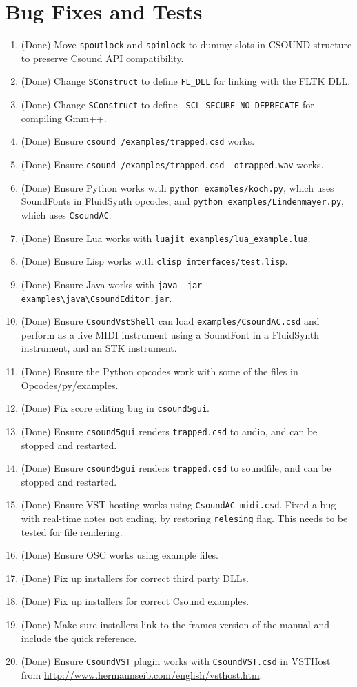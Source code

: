 \documentclass[11pt,letterpaper,onecolumn]{scrartcl}
\begin{document}
\begin{sloppypar}
\section{Bug Fixes and Tests}
\label{sec:BugFixesAndTests}

\begin{enumerate}
	\item (Done) Move \texttt{spoutlock} and \texttt{spinlock} to dummy slots in CSOUND structure to preserve Csound API compatibility.
	\item (Done) Change \texttt{SConstruct} to define \verb|FL_DLL| for linking with the FLTK DLL.
	\item (Done) Change \texttt{SConstruct} to define \verb|_SCL_SECURE_NO_DEPRECATE| for compiling Gmm++.
	\item (Done) Ensure \texttt{csound /examples/trapped.csd} works.
	\item (Done) Ensure \texttt{csound /examples/trapped.csd -otrapped.wav} works.
	\item (Done) Ensure Python works with \texttt{python examples/koch.py}, which uses SoundFonts in FluidSynth opcodes, and \texttt{python examples/Lindenmayer.py}, which uses \texttt{CsoundAC}. 
	\item (Done) Ensure Lua works with \verb|luajit examples/lua_example.lua|.
	\item (Done) Ensure Lisp works with \verb|clisp interfaces/test.lisp|.
	\item (Done) Ensure Java works with \verb|java -jar examples\java\CsoundEditor.jar|.
	\item (Done) Ensure \texttt{CsoundVstShell} can load \texttt{examples/CsoundAC.csd} and perform as a live MIDI instrument using a SoundFont in a FluidSynth instrument, and an STK instrument.
	\item (Done) Ensure the Python opcodes work with some of the files in \url{Opcodes/py/examples}.
	\item (Done) Fix score editing bug in \texttt{csound5gui}.
	\item (Done) Ensure \texttt{csound5gui} renders \texttt{trapped.csd} to audio, and can be stopped and restarted.
	\item (Done) Ensure \texttt{csound5gui} renders \texttt{trapped.csd} to soundfile, and can be stopped and restarted. 	
	\item (Done) Ensure VST hosting works using \verb|CsoundAC-midi.csd|. Fixed a bug with real-time notes not ending, by restoring \texttt{relesing} flag. This needs to be tested for file rendering.
	\item (Done) Ensure OSC works using example files.
	\item (Done) Fix up installers for correct third party DLLs.
	\item (Done) Fix up installers for correct Csound examples.
	\item (Done) Make sure installers link to the frames version of the manual and include the quick reference.
	\item (Done) Ensure \texttt{CsoundVST} plugin works with \texttt{CsoundVST.csd} in VSTHost from \url{http://www.hermannseib.com/english/vsthost.htm}.
\end{enumerate}

\end{sloppypar}
\end{document}
